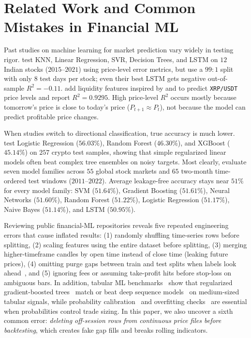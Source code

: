 \documentclass{article}
\begin{document}
\section{Related Work and Common Mistakes in Financial ML}
\label{sec:related}

Past studies on machine learning for market prediction vary widely in testing rigor. \citet{Bansal2022} test KNN, Linear Regression, SVR, Decision Trees, and LSTM on $12$ Indian stocks ($2015$--$2021$) using price-level error metrics, but use a $99{:}1$ split with only $8$ test days per stock; even their best LSTM gets negative out-of-sample $R^2 = -0.11$. \citet{Islam2025IJAES} add liquidity features inspired by \citet{Kyle1985} and \citet{Amihud2002} to predict \texttt{XRP/USDT} price levels and report $R^2 = 0.9295$. High price-level $R^2$ occurs mostly because tomorrow's price is close to today's price ($P_{t+1} \approx P_t$), not because the model can predict profitable price changes.

When studies switch to directional classification, true accuracy is much lower. \citet{Islam2025JoE} test Logistic Regression ($56.03\%$), Random Forest ($46.30\%$), and XGBoost ($45.14\%$) on $257$ crypto test samples, showing that simple regularized linear models often beat complex tree ensembles on noisy targets. Most clearly, \citet{Bustos2025} evaluate seven model families across $55$ global stock markets and $65$ two-month time-ordered test windows ($2011$--$2022$). Average leakage-free accuracy stays near $51\%$ for every model family: SVM ($51.64\%$), Gradient Boosting ($51.61\%$), Neural Networks ($51.60\%$), Random Forest ($51.22\%$), Logistic Regression ($51.17\%$), Naive Bayes ($51.14\%$), and LSTM ($50.95\%$).

Reviewing public financial-ML repositories reveals five repeated engineering errors that cause inflated results: (1) randomly shuffling time-series rows before splitting, (2) scaling features using the entire dataset before splitting, (3) merging higher-timeframe candles by open time instead of close time (leaking future prices), (4) omitting purge gaps between train and test splits when labels look ahead~\citep{LopezDePrado2018}, and (5) ignoring fees or assuming take-profit hits before stop-loss on ambiguous bars. In addition, tabular ML benchmarks~\citep{Grinsztajn2022} show that regularized gradient-boosted trees~\citep{Chen2016} match or beat deep sequence models~\citep{Hochreiter1997} on medium-sized tabular signals, while probability calibration~\citep{Platt1999, Guo2017} and overfitting checks~\citep{Bailey2014} are essential when probabilities control trade sizing. In this paper, we also uncover a sixth common error: \emph{deleting off-session rows from continuous price files before backtesting}, which creates fake gap fills and breaks rolling indicators.
\end{document}
